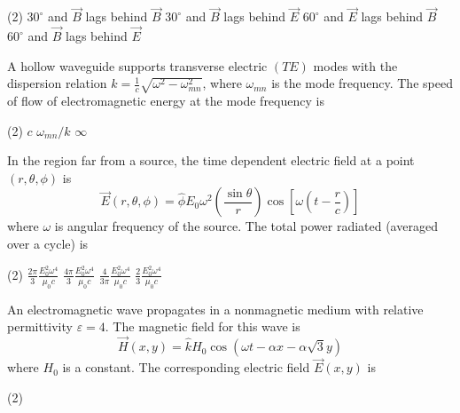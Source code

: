 \begin{enumerate}
\begin{minipage}{\textwidth}
\end{minipage}
\begin{tasks}(2)
	\task[\textbf{A.}] $30^{\circ}$ and $\vec{B}$ lags behind $\vec{B}$
	\task[\textbf{B.}]$30^{\circ}$ and $\vec{B}$ lags behind $\vec{E}$
	\task[\textbf{C.}]$60^{\circ}$ and $\vec{E}$ lags behind $\vec{B}$
	\task[\textbf{D.}]$60^{\circ}$ and $\vec{B}$ lags behind $\vec{E}$
\end{tasks}
\begin{minipage}{\textwidth}
	\item A hollow waveguide supports transverse electric $(T E)$ modes with the dispersion relation $k=\frac{1}{c} \sqrt{\omega^{2}-\omega_{m n}^{2}}$, where $\omega_{m n}$ is the mode frequency. The speed of flow of electromagnetic energy at the mode frequency is
\end{minipage}
\begin{tasks}(2)
	\task[\textbf{A.}] $c$
	\task[\textbf{B.}] $\omega_{m n} / k$
	\task[\textbf{D.}] $\infty$
\end{tasks}
\begin{minipage}{\textwidth}
	\item In the region far from a source, the time dependent electric field at a point $(r, \theta, \phi)$ is
	$$
	\vec{E}(r, \theta, \phi)=\hat{\phi} E_{0} \omega^{2}\left(\frac{\sin \theta}{r}\right) \cos \left[\omega\left(t-\frac{r}{c}\right)\right]
	$$
	where $\omega$ is angular frequency of the source. The total power radiated (averaged over a cycle) is
\end{minipage}
\begin{tasks}(2)
	\task[\textbf{A.}] $\frac{2 \pi}{3} \frac{E_{0}^{2} \omega^{4}}{\mu_{0} c}$
	\task[\textbf{B.}]$\frac{4 \pi}{3} \frac{E_{0}^{2} \omega^{4}}{\mu_{0} c}$
	\task[\textbf{C.}]$\frac{4}{3 \pi} \frac{E_{0}^{2} \omega^{4}}{\mu_{0} c}$
	\task[\textbf{D.}]$\frac{2}{3} \frac{E_{0}^{2} \omega^{4}}{\mu_{0} c}$
\end{tasks}
\begin{minipage}{\textwidth}
	\item An electromagnetic wave propagates in a nonmagnetic medium with relative permittivity $\varepsilon=4$. The magnetic field for this wave is
	$$
	\vec{H}(x, y)=\hat{k} H_{0} \cos (\omega t-\alpha x-\alpha \sqrt{3} y)
	$$
	where $H_{0}$ is a constant. The corresponding electric field $\vec{E}(x, y)$ is
\end{minipage}
\begin{tasks}(2)

\end{tasks}
\end{enumerate}
